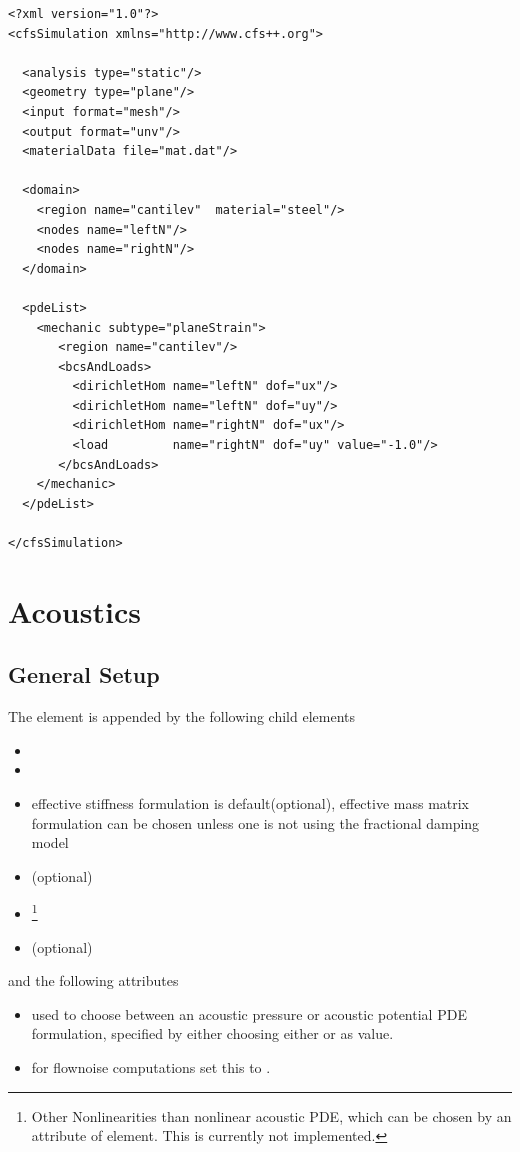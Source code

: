 {\footnotesize 
\begin{verbatim}
<?xml version="1.0"?>
<cfsSimulation xmlns="http://www.cfs++.org">

  <analysis type="static"/>
  <geometry type="plane"/>
  <input format="mesh"/>
  <output format="unv"/>
  <materialData file="mat.dat"/>

  <domain>
    <region name="cantilev"  material="steel"/>
    <nodes name="leftN"/>
    <nodes name="rightN"/>
  </domain>

  <pdeList>
    <mechanic subtype="planeStrain">
       <region name="cantilev"/>
       <bcsAndLoads>
         <dirichletHom name="leftN" dof="ux"/>
         <dirichletHom name="leftN" dof="uy"/>
         <dirichletHom name="rightN" dof="ux"/>
         <load         name="rightN" dof="uy" value="-1.0"/>
       </bcsAndLoads>
    </mechanic>
  </pdeList>

</cfsSimulation>
\end{verbatim}
}


\newpage
\section{Acoustics}

\subsection{General Setup}
The  element is appended by the following child elements
\begin{itemize}
\item {}
\item {}
\item {} effective stiffness formulation 
is default(optional), effective mass matrix formulation can be chosen unless one is not using the fractional damping model
\item {} (optional)
\item {}\footnote{Other Nonlinearities than nonlinear acoustic
 PDE, which can be chosen by an attribute of  element. This is
 currently not implemented.}
\item {} (optional)
\end{itemize}
and the following attributes
\begin{itemize}
\item {} used to choose between an acoustic pressure or
      acoustic potential PDE formulation, specified by either choosing
      either  or  as value.
\item {} for flownoise computations set this to .
\end{itemize}

